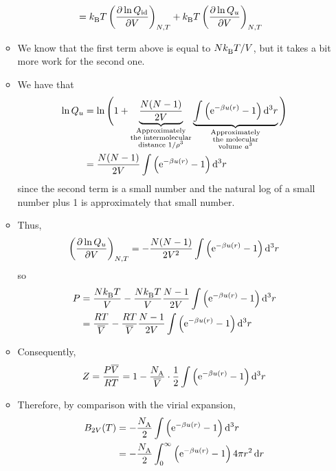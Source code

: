 \documentclass[../notes.tex]{subfiles}
\begin{document}
\begin{itemize}
\begin{itemize}
\begin{align*}
            &= \kB T\left( \pdv{\ln Q_\text{id}}{V} \right)_{N,T}+\kB T\left( \pdv{\ln Q_u}{V} \right)_{N,T}
        \end{align*}
        \item We know that the first term above is equal to $N\kB T/V$, but it takes a bit more work for the second one.
        \item We have that
        \begin{align*}
            \ln Q_u &= \ln\Bigg( 1+\underbrace{\frac{N(N-1)}{2V}}_{\substack{\text{Approximately}\\\text{the intermolecular}\\\text{distance }1/\rho^3}}\underbrace{\int\left( \e[-\beta u(r)]-1 \right)\dd[3]{r}}_{\substack{\text{Approximately}\\\text{the molecular}\\\text{volume }a^3}} \Bigg)\\
            &= \frac{N(N-1)}{2V}\int\left( \e[-\beta u(r)]-1 \right)\dd[3]{r}
        \end{align*}
        since the second term is a small number and the natural log of a small number plus 1 is approximately that small number.
        \item Thus,
        \begin{equation*}
            \left( \pdv{\ln Q_u}{V} \right)_{N,T} = -\frac{N(N-1)}{2V^2}\int\left( \e[-\beta u(r)]-1 \right)\dd[3]{r}
        \end{equation*}
        so
        \begin{align*}
            P &= \frac{N\kB T}{V}-\frac{N\kB T}{V}\frac{N-1}{2V}\int\left( \e[-\beta u(r)]-1 \right)\dd[3]{r}\\
            &= \frac{RT}{\overline{V}}-\frac{RT}{\overline{V}}\frac{N-1}{2V}\int\left( \e[-\beta u(r)]-1 \right)\dd[3]{r}
        \end{align*}
        \item Consequently,
        \begin{equation*}
            Z = \frac{P\overline{V}}{RT} = 1-\frac{\NA}{\overline{V}}\cdot\frac{1}{2}\int\left( \e[-\beta u(r)]-1 \right)\dd[3]{r}
        \end{equation*}
        \item Therefore, by comparison with the virial expansion,
        \begin{align*}
            B_{2V}(T) &= -\frac{\NA}{2}\int\left( \e[-\beta u(r)]-1 \right)\dd[3]{r}\\
            &= -\frac{\NA}{2}\int_0^\infty\left( \e[-\beta u(r)]-1 \right)4\pi r^2\dd{r}\\

\end{align*}
\end{itemize}
\end{itemize}
\end{document}
